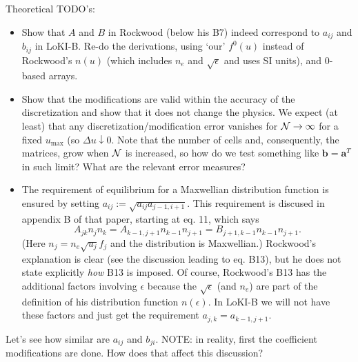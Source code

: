 \documentclass{book}
\newcommand{\bmat}[1]{{\ensuremath{\bm {#1}}}}
\begin{document}
Theoretical TODO's:
\begin{itemize}
    \item Show that $A$ and $B$ in Rockwood (below his B7) indeed correspond to
	$a_{ij}$ and $b_{ij}$ in LoKI-B. Re-do the derivations, using `our'
	$f^0(u)$ instead of Rockwood's $n(u)$ (which includes $n_e$ and $\sqrt{\epsilon}$
	and uses SI units), and 0-based arrays.
    \item Show that the modifications are valid within the accuracy of
	the discretization and show that it does not change the physics. We
	expect (at least) that any discretization/modification error vanishes
	for ${\cal N}\rightarrow\infty$ for a fixed $u_{\text{max}}$ (so
	$\Delta u\downarrow 0$. Note that the number of cells and,
	consequently, the matrices, grow when ${\cal N}$ is increased, so how
	do we test something like $\bmat{b}=\bmat{a}^T$ in such limit? What
	are the relevant error measures?
    \item The requirement of equilibrium for a Maxwellian distribution function
	is ensured by setting $a_{ij}:=\sqrt{a_{ij}a_{j-1,i+1}}$.
	This requirement is discused in appendix B of that paper, starting at
	eq. 11, which says
	\[
		A_{jk}n_jn_k = A_{k-1,j+1}n_{k-1}n_{j+1} = B_{j+1,k-1}n_{k-1}n_{j+1}.
	\]
	(Here $n_j=n_e\sqrt{u_j}f_j$ and the distribution is Maxwellian.)
	Rockwood's explanation is clear (see the discussion leading to eq. B13),
	but he does not state explicitly {\em how} B13 is imposed.
	Of course, Rockwood's B13 has the additional factors involving $\epsilon$
	because the $\sqrt{\epsilon}$ (and $n_e$) are part of the definition of
	his distribution function $n(\epsilon)$. In LoKI-B we will not have these
	factors and just get the requirement $a_{j,k}=a_{k-1,j+1}$.
\end{itemize}

Let's see how similar are $a_{ij}$ and $b_{ji}$.
NOTE: in reality, first the coefficient modifications are done.
How does that affect this discussion?
\end{document}
